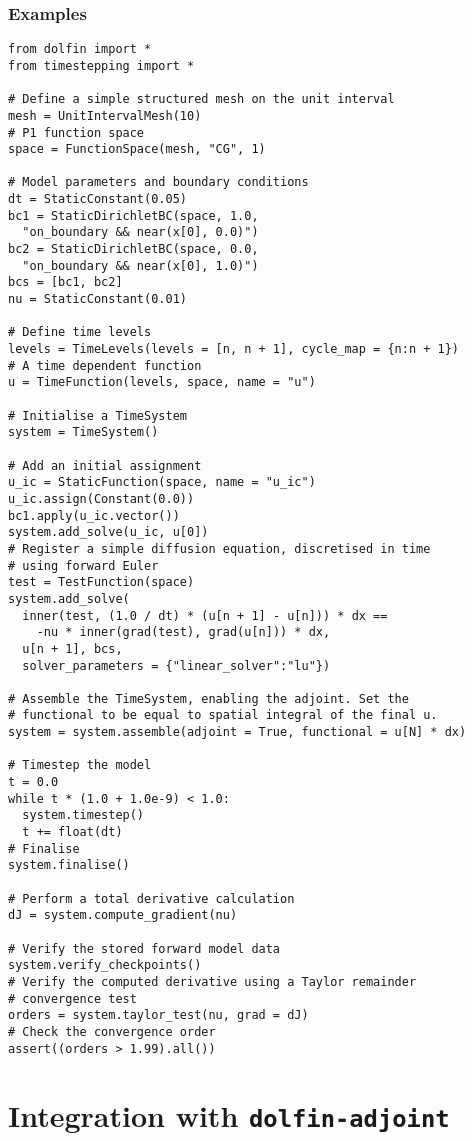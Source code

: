 \documentclass[a4paper]{book}
\begin{document}
\subsection*{Examples}

\begin{lstlisting}
from dolfin import *
from timestepping import *

# Define a simple structured mesh on the unit interval
mesh = UnitIntervalMesh(10)
# P1 function space
space = FunctionSpace(mesh, "CG", 1)

# Model parameters and boundary conditions
dt = StaticConstant(0.05)
bc1 = StaticDirichletBC(space, 1.0,
  "on_boundary && near(x[0], 0.0)")
bc2 = StaticDirichletBC(space, 0.0,
  "on_boundary && near(x[0], 1.0)")
bcs = [bc1, bc2]
nu = StaticConstant(0.01)

# Define time levels
levels = TimeLevels(levels = [n, n + 1], cycle_map = {n:n + 1})
# A time dependent function
u = TimeFunction(levels, space, name = "u")

# Initialise a TimeSystem
system = TimeSystem()

# Add an initial assignment
u_ic = StaticFunction(space, name = "u_ic")
u_ic.assign(Constant(0.0))
bc1.apply(u_ic.vector())
system.add_solve(u_ic, u[0])
# Register a simple diffusion equation, discretised in time
# using forward Euler
test = TestFunction(space)
system.add_solve(
  inner(test, (1.0 / dt) * (u[n + 1] - u[n])) * dx ==
    -nu * inner(grad(test), grad(u[n])) * dx,
  u[n + 1], bcs,
  solver_parameters = {"linear_solver":"lu"})

# Assemble the TimeSystem, enabling the adjoint. Set the
# functional to be equal to spatial integral of the final u.
system = system.assemble(adjoint = True, functional = u[N] * dx)

# Timestep the model
t = 0.0
while t * (1.0 + 1.0e-9) < 1.0:
  system.timestep()
  t += float(dt)
# Finalise
system.finalise()

# Perform a total derivative calculation
dJ = system.compute_gradient(nu)

# Verify the stored forward model data
system.verify_checkpoints()
# Verify the computed derivative using a Taylor remainder
# convergence test
orders = system.taylor_test(nu, grad = dJ)
# Check the convergence order
assert((orders > 1.99).all())
\end{lstlisting}

\chapter{Integration with \texttt{dolfin-adjoint}}
\end{document}
